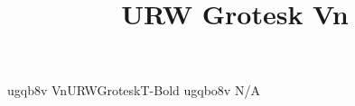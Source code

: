 \documentclass[test]{vnsample}
\title{URW Grotesk Vn}
\begin{document}
\begin{shortsample}
  {ugqb8v}   {VnURWGroteskT-Bold}
 {ugqbo8v}  {N/A}
\end{shortsample}
\end{document}
